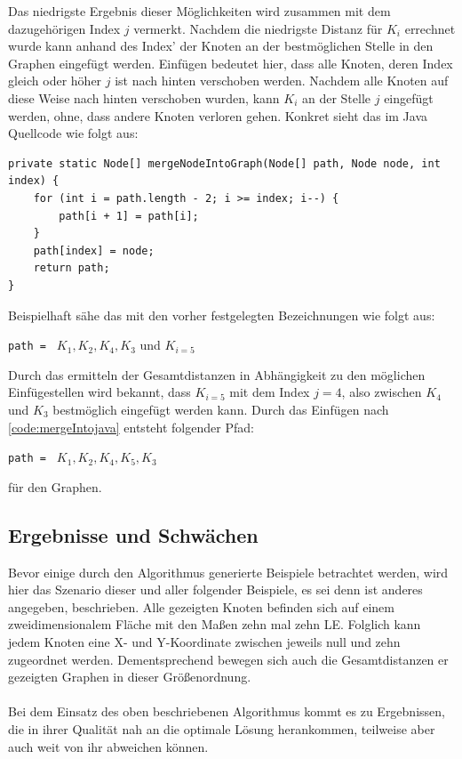 Das niedrigste Ergebnis dieser Möglichkeiten wird zusammen mit dem dazugehörigen Index $j$ vermerkt. 
Nachdem die niedrigste Distanz für $K_i$ errechnet wurde kann anhand des Index' der Knoten an der bestmöglichen Stelle in den Graphen eingefügt werden. 
Einfügen bedeutet hier, dass alle Knoten, deren Index gleich oder höher $j$ ist nach hinten verschoben werden. 
Nachdem alle Knoten auf diese Weise nach hinten verschoben wurden, kann $K_i$ an der Stelle $j$ eingefügt werden, ohne, dass andere Knoten verloren gehen. 
Konkret sieht das im Java Quellcode wie folgt aus:
\begin{lstlisting}[caption={Einfügen von Knoten in einen bestehenden Graph}, label={code:mergeIntojava}]
private static Node[] mergeNodeIntoGraph(Node[] path, Node node, int index) {
    for (int i = path.length - 2; i >= index; i--) {
        path[i + 1] = path[i];
    }
    path[index] = node;
    return path;
}
\end{lstlisting}
Beispielhaft sähe das mit den vorher festgelegten Bezeichnungen wie folgt aus: 
\begin{addmargin}[1em]{2em}
\lstinline{path = } $K_1, K_2, K_4, K_3$ und $K_{i = 5}$ 
\end{addmargin}
Durch das ermitteln der Gesamtdistanzen in Abhängigkeit zu den möglichen Einfügestellen wird bekannt, dass $K_{i=5}$ mit dem Index $j=4$, also zwischen $K_4$ und $K_3$ bestmöglich eingefügt werden kann. 
Durch das Einfügen nach \vref{code:mergeIntojava} entsteht folgender Pfad:
\begin{addmargin}[1em]{2em}
\lstinline{path = } $K_1, K_2, K_4, K_5, K_3$
\end{addmargin}
für den Graphen.

\subsection{Ergebnisse und Schwächen} \label{sec:inserst-first-erg}
Bevor einige durch den Algorithmus generierte Beispiele betrachtet werden, wird hier das Szenario dieser und aller folgender Beispiele, es sei denn ist anderes angegeben, beschrieben.
Alle gezeigten Knoten befinden sich auf einem zweidimensionalem Fläche mit den Maßen zehn mal zehn \ac{LE}.
Folglich kann jedem Knoten eine X- und Y-Koordinate zwischen jeweils null und zehn zugeordnet werden. 
Dementsprechend bewegen sich auch die Gesamtdistanzen er gezeigten Graphen in dieser Größenordnung.
\\\\
Bei dem Einsatz des oben beschriebenen Algorithmus kommt es zu Ergebnissen, die in ihrer Qualität nah an die optimale Lösung herankommen, teilweise aber auch weit von ihr abweichen können.  

